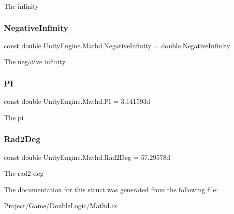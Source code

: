 The infinity 

\mbox{\label{struct_unity_engine_1_1_mathd_aaf01677761267c23a62df97cf207775c}} 
\subsubsection{\texorpdfstring{Negative\+Infinity}{NegativeInfinity}}
{\footnotesize\ttfamily const double Unity\+Engine.\+Mathd.\+Negative\+Infinity = double.\+Negative\+Infinity}



The negative infinity 

\mbox{\label{struct_unity_engine_1_1_mathd_ab807c2e936b0f875f4129b7a1471cce3}} 
\subsubsection{\texorpdfstring{PI}{PI}}
{\footnotesize\ttfamily const double Unity\+Engine.\+Mathd.\+PI = 3.\+141593d}



The pi 

\mbox{\label{struct_unity_engine_1_1_mathd_a7d2eb5795fdcf10c75d24e1485b23498}} 
\subsubsection{\texorpdfstring{Rad2\+Deg}{Rad2Deg}}
{\footnotesize\ttfamily const double Unity\+Engine.\+Mathd.\+Rad2\+Deg = 57.\+29578d}



The rad2 deg 



The documentation for this struct was generated from the following file\+:\begin{DoxyCompactItemize}
\item 
Project/\+Game/\+Double\+Logic/Mathd.\+cs\end{DoxyCompactItemize}
